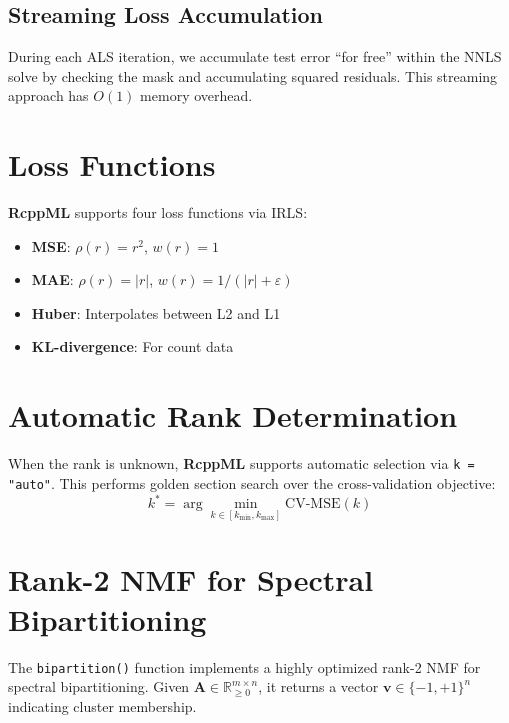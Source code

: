 \documentclass[11pt]{article}
\newcommand{\pkg}[1]{\textbf{#1}}
\newcommand{\code}[1]{\texttt{#1}}
\newcommand{\fct}[1]{\code{#1()}}
\begin{document}
\subsection{Streaming Loss Accumulation}

During each ALS iteration, we accumulate test error ``for free'' within the 
NNLS solve by checking the mask and accumulating squared residuals. This 
streaming approach has $O(1)$ memory overhead.


\section{Loss Functions}

\pkg{RcppML} supports four loss functions via IRLS:

\begin{itemize}
  \item \textbf{MSE}: $\rho(r) = r^2$, $w(r) = 1$
  \item \textbf{MAE}: $\rho(r) = |r|$, $w(r) = 1/(|r| + \varepsilon)$
  \item \textbf{Huber}: Interpolates between L2 and L1
  \item \textbf{KL-divergence}: For count data
\end{itemize}


\section{Automatic Rank Determination}

When the rank is unknown, \pkg{RcppML} supports automatic selection via 
\code{k = "auto"}. This performs golden section search over the 
cross-validation objective:
\begin{equation}
  k^* = \arg\min_{k \in [k_{\min}, k_{\max}]} \text{CV-MSE}(k)
\end{equation}


\section{Rank-2 NMF for Spectral Bipartitioning}

The \fct{bipartition} function implements a highly optimized rank-2 NMF 
for spectral bipartitioning. Given $\mathbf{A} \in \mathbb{R}_{\geq 0}^{m \times n}$, 
it returns a vector $\mathbf{v} \in \{-1, +1\}^n$ indicating cluster membership.
\end{document}
